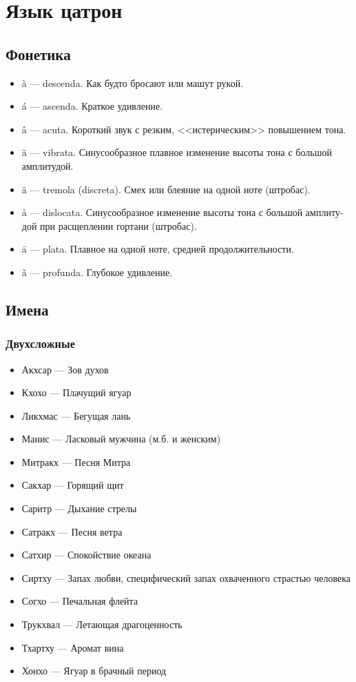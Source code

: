 \documentclass[a4paper,12pt,fleqn]{book}\usepackage{polyglossia}\setdefaultlanguage[babelshorthands=true]{russian}\setotherlanguage{english}\defaultfontfeatures{Ligatures=TeX,Mapping=tex-text}\usepackage{xcolor}\newcommand{\ml}[3]{#2}
\begin{document}
{\section{Язык цатрон}

\subsection{Фонетика}

\begin{itemize}
\item \`a --- descenda. Как будто бросают или машут рукой.
\item \'a --- ascenda. Краткое удивление.
\item \^a --- acuta. Короткий звук с резким, <<истерическим>> повышением тона.
\item \~a --- vibrata. Синусообразное плавное изменение высоты тона с большой амплитудой.
\item \"a --- tremola (discreta). Смех или блеяние на одной ноте (штробас).
\item \r{a} --- dislocata. Синусообразное изменение высоты тона с большой амплитудой при расщеплении гортани (штробас).
\item \=a --- plata. Плавное на одной ноте, средней продолжительности.
\item \v{a} --- profunda. Глубокое удивление.
\end{itemize}

\subsection{Имена}

\subsubsection{Двухсложные}

\begin{itemize}
\item Акхсар --- Зов духов
\item Кхохо --- Плачущий ягуар
\item Ликхмас --- Бегущая лань
\item Манис --- Ласковый мужчина (м.б. и женским)
\item Митракх --- Песня Митра
\item Сакхар --- Горящий щит
\item Саритр --- Дыхание стрелы
\item Сатракх --- Песня ветра
\item Сатхир --- Спокойствие океана
\item Сиртху --- Запах любви, специфический запах охваченного страстью человека
\item Согхо --- Печальная флейта
\item Трукхвал --- Летающая драгоценность
\item Тхартху --- Аромат вина
\item Хонхо --- Ягуар в брачный период
\end{itemize}

}
\end{document}
